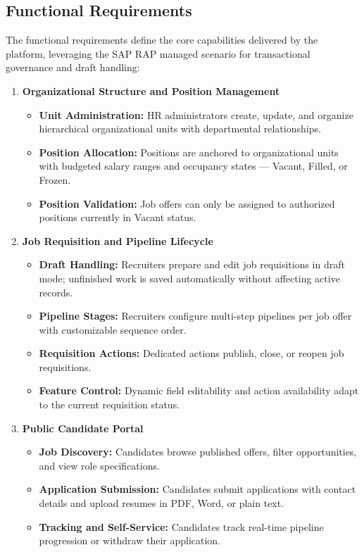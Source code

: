 \subsection{Functional Requirements}
\label{subsec:functional_requirements}

The functional requirements define the core capabilities delivered by the platform, leveraging the SAP RAP managed scenario for transactional governance and draft handling:

\begin{enumerate}

    \item \textbf{Organizational Structure and Position Management}
    \begin{itemize}
        \item \textbf{Unit Administration:} HR administrators create, update, and organize hierarchical organizational units with departmental relationships.
        \item \textbf{Position Allocation:} Positions are anchored to organizational units with budgeted salary ranges and occupancy states --- Vacant, Filled, or Frozen.
        \item \textbf{Position Validation:} Job offers can only be assigned to authorized positions currently in Vacant status.
    \end{itemize}

    \item \textbf{Job Requisition and Pipeline Lifecycle}
    \begin{itemize}
        \item \textbf{Draft Handling:} Recruiters prepare and edit job requisitions in draft mode; unfinished work is saved automatically without affecting active records.
        \item \textbf{Pipeline Stages:} Recruiters configure multi-step pipelines per job offer with customizable sequence order.
        \item \textbf{Requisition Actions:} Dedicated actions publish, close, or reopen job requisitions.
        \item \textbf{Feature Control:} Dynamic field editability and action availability adapt to the current requisition status.
    \end{itemize}

    \item \textbf{Public Candidate Portal}
    \begin{itemize}
        \item \textbf{Job Discovery:} Candidates browse published offers, filter opportunities, and view role specifications.
        \item \textbf{Application Submission:} Candidates submit applications with contact details and upload resumes in PDF, Word, or plain text.
        \item \textbf{Tracking and Self-Service:} Candidates track real-time pipeline progression or withdraw their application.
    \end{itemize}


\end{enumerate}
